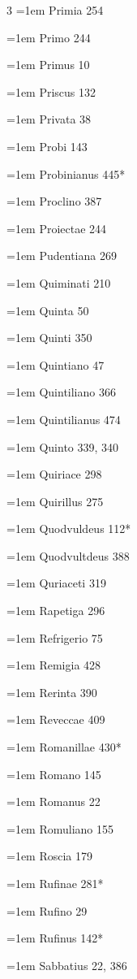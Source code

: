 \begin{multicols}{3}
\hangindent=1em Primia 254\par
\hangindent=1em Primo 244\par
\hangindent=1em Primus 10\par
\hangindent=1em Priscus 132\par
\hangindent=1em Privata 38\par
\hangindent=1em Probi 143\par
\hangindent=1em Probinianus 445*\par
\hangindent=1em Proclino 387\par
\hangindent=1em Proiectae 244\par
\hangindent=1em Pudentiana 269\par
\hangindent=1em Quiminati 210\par
\hangindent=1em Quinta 50\par
\hangindent=1em Quinti 350\par
\hangindent=1em Quintiano 47\par
\hangindent=1em Quintiliano 366\par
\hangindent=1em Quintilianus 474\par
\hangindent=1em Quinto 339, 340\par
\hangindent=1em Quiriace 298\par
\hangindent=1em Quirillus 275\par
\hangindent=1em Quodvuldeus 112*\par
\hangindent=1em Quodvultdeus 388\par
\hangindent=1em Quriaceti 319\par
\hangindent=1em Rapetiga 296\par
\hangindent=1em Refrigerio 75\par
\hangindent=1em Remigia 428\par
\hangindent=1em Rerinta 390\par
\hangindent=1em Reveccae 409\par
\hangindent=1em Romanillae 430*\par
\hangindent=1em Romano 145\par
\hangindent=1em Romanus 22\par
\hangindent=1em Romuliano 155\par
\hangindent=1em Roscia 179\par
\hangindent=1em Rufinae 281*\par
\hangindent=1em Rufino 29\par
\hangindent=1em Rufinus 142*\par
\hangindent=1em Sabbatius 22, 386\par

\end{multicols}
